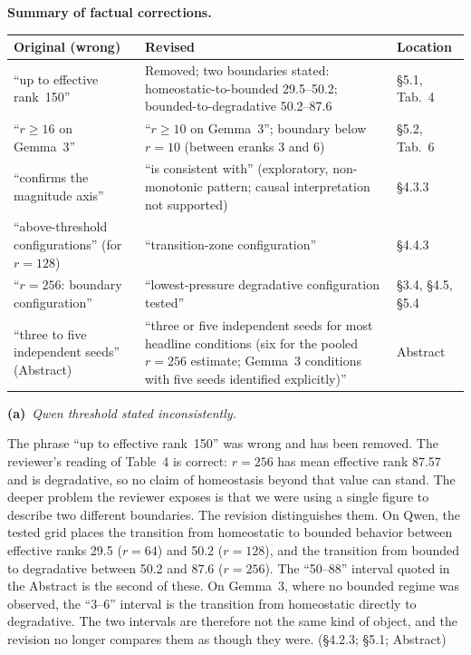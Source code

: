 \documentclass[11pt,a4paper]{article}
\newcommand{\newtext}[1]{#1}
\newcommand{\rsub}[2]{%
  \medskip\noindent\textbf{#1}~\textit{#2}\par\smallskip%
}
\newcommand{\newtext}[1]{\textcolor{chgcolor}{``#1''}}
\begin{document}
\medskip
\noindent\textbf{Summary of factual corrections.}\par\smallskip
\renewcommand{\arraystretch}{1.1}
\begin{tabular}{@{}L{4.2cm}L{5.2cm}L{4.0cm}@{}}
\toprule
\textbf{Original (wrong)} & \textbf{Revised} & \textbf{Location} \\
\midrule
``up to effective rank~150'' & Removed; two boundaries stated:
  homeostatic-to-bounded 29.5--50.2; bounded-to-degradative 50.2--87.6
  & \S5.1, Tab.~4 \\[3pt]
``$r \geq 16$ on Gemma~3'' & ``$r \geq 10$ on Gemma~3''; boundary below $r=10$
  (between eranks 3 and 6) & \S5.2, Tab.~6 \\[3pt]
``confirms the magnitude axis'' & ``is consistent with'' (exploratory, non-monotonic
  pattern; causal interpretation not supported) & \S4.3.3 \\[3pt]
``above-threshold configurations'' (for $r=128$) & ``transition-zone configuration'' & \S4.4.3 \\[3pt]
``$r=256$: boundary configuration'' & ``lowest-pressure degradative configuration tested'' & \S3.4, \S4.5, \S5.4 \\[3pt]
``three to five independent seeds'' (Abstract) & ``three or five independent seeds for most headline conditions (six for the pooled $r{=}256$ estimate; Gemma~3 conditions with five seeds identified explicitly)'' & Abstract \\
\bottomrule
\end{tabular}
\renewcommand{\arraystretch}{1.15}
\medskip

\rsub{(a)}{Qwen threshold stated inconsistently.}
The phrase ``up to effective rank~150'' was wrong and has been removed.
The reviewer's reading of Table~4 is correct: $r=256$ has mean effective
rank 87.57 and is degradative, so no claim of homeostasis beyond that
value can stand. The deeper problem the reviewer exposes is that we were
using a single figure to describe two different boundaries. The revision
distinguishes them. On Qwen, the tested grid places the transition from
homeostatic to bounded behavior between effective ranks 29.5 ($r=64$)
and 50.2 ($r=128$), and the transition from bounded to degradative
between 50.2 and 87.6 ($r=256$). The ``50--88'' interval quoted in the
Abstract is the second of these. On Gemma~3, where no bounded regime was
observed, the ``3--6'' interval is the transition from homeostatic
directly to degradative. The two intervals are therefore not the same
kind of object, and the revision no longer compares them as though they
were.
\newtext{(\S4.2.3; \S5.1; Abstract)}
\end{document}
